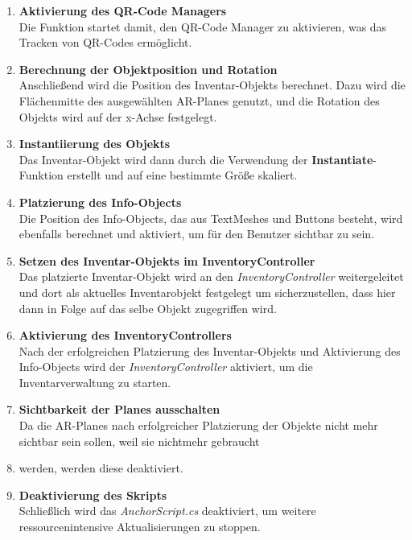 \begin{enumerate}
    \item \textbf{Aktivierung des QR-Code Managers}\\
    Die Funktion startet damit, den QR-Code Manager zu aktivieren, was das Tracken von QR-Codes ermöglicht.
    \item \textbf{Berechnung der Objektposition und Rotation}\\
    Anschließend wird die Position des Inventar-Objekts berechnet. Dazu wird die Flächenmitte des ausgewählten AR-Planes
    genutzt, und die Rotation des Objekts wird auf der x-Achse festgelegt.
    \item \textbf{Instantiierung des Objekts}\\ Das Inventar-Objekt wird dann durch die Verwendung der \textbf{Instantiate}-Funktion
    erstellt und auf eine bestimmte Größe skaliert.
    \item \textbf{Platzierung des Info-Objects}\\
    Die Position des Info-Objects, das aus TextMeshes und Buttons besteht, wird ebenfalls berechnet und aktiviert, um für
    den Benutzer sichtbar zu sein.
    \item \textbf{Setzen des Inventar-Objekts im InventoryController}\\
    Das platzierte Inventar-Objekt wird an den \textit{InventoryController} weitergeleitet und dort als aktuelles Inventarobjekt
    festgelegt um sicherzustellen, dass hier dann in Folge auf das selbe Objekt zugegriffen wird.
    \item \textbf{Aktivierung des InventoryControllers}\\
    Nach der erfolgreichen Platzierung des Inventar-Objekts und Aktivierung des Info-Objects wird der \textit{InventoryController}
    aktiviert, um die Inventarverwaltung zu starten.
    \item \textbf{Sichtbarkeit der Planes ausschalten}\\
    Da die AR-Planes nach erfolgreicher Platzierung der Objekte nicht mehr sichtbar sein sollen, weil sie nichtmehr gebraucht
    \item werden, werden diese deaktiviert.
    \item \textbf{Deaktivierung des Skripts}\\
    Schließlich wird das \textit{AnchorScript.cs} deaktiviert, um weitere ressourcenintensive Aktualisierungen zu stoppen.\\
\end{enumerate}\\


